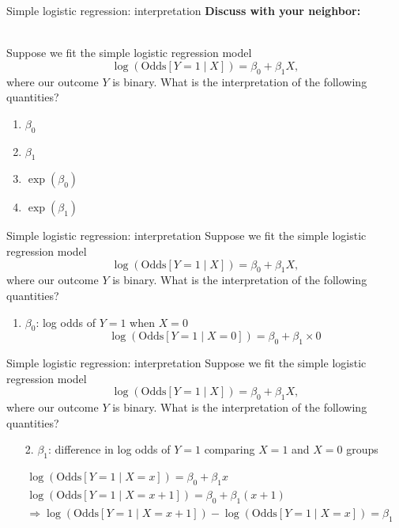 \documentclass[10pt,t]{beamer}
\begin{document}
\begin{frame}{Simple logistic regression: interpretation}
	\textbf{Discuss with your neighbor:}
	\\ ~\
	
	Suppose we fit the simple logistic regression model $$\log\left(\text{Odds}[Y =1 \mid X]\right) = \beta_0 + \beta_1 X,$$ where our outcome $Y$ is binary. What is the interpretation of the following quantities?
	\begin{enumerate}
		\item $\beta_0$
		\item $\beta_1$
		\item $\exp(\beta_0)$
		\item $\exp(\beta_1)$
	\end{enumerate} 
\end{frame}

\begin{frame}{Simple logistic regression: interpretation}
	Suppose we fit the simple logistic regression model $$\log\left(\text{Odds}[Y =1 \mid X]\right) = \beta_0 + \beta_1 X,$$ where our outcome $Y$ is binary. What is the interpretation of the following quantities?
	\begin{enumerate}
		\item $\beta_0$: log odds of $Y = 1$ when $X = 0$
		$$\log\left(\text{Odds}[Y =1 \mid X = 0]\right) = \beta_0 + \beta_1\times 0$$
	\end{enumerate} 
\end{frame}

\begin{frame}{Simple logistic regression: interpretation}
	Suppose we fit the simple logistic regression model $$\log\left(\text{Odds}[Y =1 \mid X]\right) = \beta_0 + \beta_1 X,$$ where our outcome $Y$ is binary. What is the interpretation of the following quantities?
	\begin{enumerate}
		\item[2.] $\beta_1$: difference in log odds of $Y = 1$ comparing $X = 1$ and $X =0$ groups
	\end{enumerate} 
	\begin{align*}
	&\log\left(\text{Odds}[Y =1 \mid X = x]\right) = \beta_0 + \beta_1x\\
	&\log\left(\text{Odds}[Y =1 \mid X = x + 1]\right) = \beta_0 + \beta_1(x + 1)\\
	&\Rightarrow \log\left(\text{Odds}[Y =1 \mid X = x + 1]\right) - \log\left(\text{Odds}[Y =1 \mid X = x ]\right) = \beta_1
\end{align*}
\end{frame}
\end{document}
